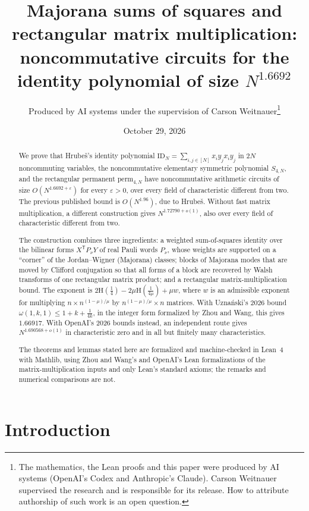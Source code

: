 \documentclass[11pt]{article}
\title{Majorana sums of squares and rectangular matrix multiplication:\\
noncommutative circuits for the identity polynomial of size $N^{1.6692}$}
\author{Produced by AI systems under the supervision of Carson Weitnauer\thanks{The mathematics, the Lean proofs
and this paper were produced by AI systems (OpenAI's Codex and Anthropic's Claude). Carson Weitnauer supervised the
research and is responsible for its release. How to attribute authorship of such work is an open question.}}
\date{October 29, 2026}
\theoremstyle{definition}
\theoremstyle{remark}
\newcommand{\ID}{\mathrm{ID}}
\newcommand{\Hb}{\mathrm{H}}
\begin{document}
\maketitle

\begin{abstract}
We prove that Hrube\v{s}'s identity polynomial $\ID_N=\sum_{i,j\in[N]}x_iy_jx_iy_j$ in $2N$ noncommuting
variables, the noncommutative elementary symmetric polynomial $S_{4,N}$, and the rectangular permanent
$\mathrm{perm}_{4,N}$ have noncommutative arithmetic circuits of size $O(N^{1.6692+\varepsilon})$ for every
$\varepsilon>0$, over every field of characteristic different from two. The previous published bound is
$O(N^{1.96})$, due to Hrube\v{s}. Without fast matrix multiplication, a different construction gives
$N^{1.72790+o(1)}$, also over every field of characteristic different from two.

The construction combines three ingredients: a weighted sum-of-squares identity over the bilinear forms
$X^{\mathsf T}P_\nu Y$ of real Pauli words $P_\nu$, whose weights are supported on a ``corner'' of the
Jordan--Wigner (Majorana) classes; blocks of Majorana modes that are moved by Clifford conjugation so that all forms
of a block are recovered by Walsh transforms of one rectangular matrix product; and a rectangular
matrix-multiplication bound. The
exponent is $2\Hb(\tfrac14)-2\mu\Hb(\tfrac1{4\mu})+\mu w$, where $w$ is an admissible exponent for multiplying
$n\times n^{(1-\mu)/\mu}$ by $n^{(1-\mu)/\mu}\times n$ matrices. With Uzna\'nski's 2026 bound
$\omega(1,k,1)\le1+k+\frac1{4k}$, in the integer form formalized by Zhou and Wang, this gives $1.66917$. With
OpenAI's 2026 bounds instead, an independent route gives $N^{1.690568+o(1)}$ in characteristic zero and in all but
finitely many characteristics.

The theorems and lemmas stated here are formalized and machine-checked in Lean~4 with Mathlib, using Zhou and
Wang's and OpenAI's Lean formalizations of the matrix-multiplication inputs and only Lean's standard axioms; the
remarks and numerical comparisons are not.
\end{abstract}

\section{Introduction}
\end{document}
